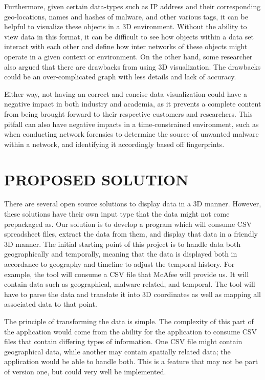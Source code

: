 \documentclass[journal,10pt,onecolumn,compsoc]{IEEEtran} \usepackage[margin=1.0in]{geometry} \usepackage{pdfpages}
\begin{document}
    \noindent \newline Furthermore, given certain data-types such as IP address and their corresponding geo-locations, names and hashes of malware, and other various tags, it can be helpful to visualize these objects in a 3D environment. Without the ability to view data in this format, it can be difficult to see how objects within a data set interact with each other and define how inter networks of these objects might operate in a given context or environment. On the other hand, some researcher also argued that there are drawbacks from using 3D visualization. The drawbacks could be an over-complicated graph with less details and lack of accuracy.
    
    \noindent \newline Either way, not having an correct and concise data visualization could have a negative impact in both industry and academia, as it prevents a complete content from being brought forward to their respective customers and researchers. This pitfall can also have negative impacts in a time-constrained environment, such as when conducting network forensics to determine the source of unwanted malware within a network, and identifying it accordingly based off fingerprints.

\section{PROPOSED SOLUTION}
There are several open source solutions to display data in a 3D manner. However, these solutions have their own input type that the data might not come prepackaged as. Our solution is to develop a program which will consume CSV spreadsheet files, extract the data from them, and display that data in a friendly 3D manner. The initial starting point of this project is to handle data both geographically and temporally, meaning that the data is displayed both in accordance to geography and timeline to adjust the temporal history. For example, the tool will consume a CSV file that McAfee will provide us. It will contain data such as geographical, malware related, and temporal. The tool will have to parse the data and translate it into 3D coordinates as well as mapping all associated data to that point.

 
 \noindent \newline The principle of transforming the data is simple. The complexity of this part of the application would come from the ability for the application to consume CSV files that contain differing types of information. One CSV file might contain geographical data, while another may contain spatially related data; the application would be able to handle both. This is a feature that may not be part of version one, but could very well be implemented.
\end{document}
